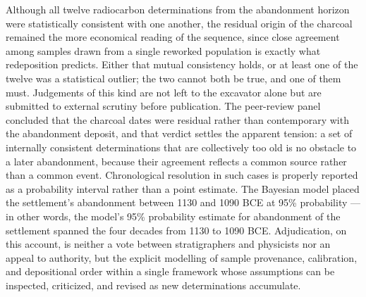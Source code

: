 \documentclass[11pt]{article}
\begin{document}
{Although all twelve radiocarbon determinations from the abandonment horizon were statistically consistent with one another, the residual origin of the charcoal remained the more economical reading of the sequence, since close agreement among samples drawn from a single reworked population is exactly what redeposition predicts. Either that mutual consistency holds, or at least one of the twelve was a statistical outlier; the two cannot both be true, and one of them must. Judgements of this kind are not left to the excavator alone but are submitted to external scrutiny before publication. The peer-review panel concluded that the charcoal dates were residual rather than contemporary with the abandonment deposit, and that verdict settles the apparent tension: a set of internally consistent determinations that are collectively too old is no obstacle to a later abandonment, because their agreement reflects a common source rather than a common event. Chronological resolution in such cases is properly reported as a probability interval rather than a point estimate. The Bayesian model placed the settlement's abandonment between 1130 and 1090 BCE at 95\% probability — in other words, the model's 95\% probability estimate for abandonment of the settlement spanned the four decades from 1130 to 1090 BCE. Adjudication, on this account, is neither a vote between stratigraphers and physicists nor an appeal to authority, but the explicit modelling of sample provenance, calibration, and depositional order within a single framework whose assumptions can be inspected, criticized, and revised as new determinations accumulate.}
\end{document}

